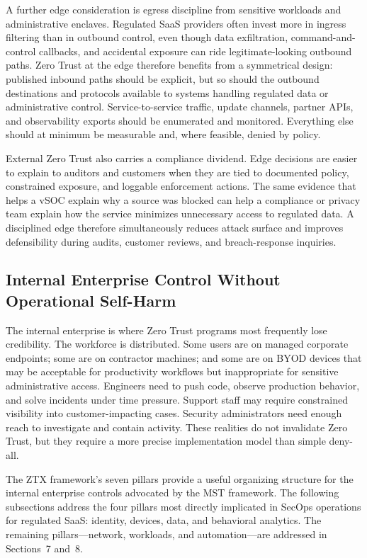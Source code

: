 \documentclass[acmlarge]{acmart}
\begin{document}
A further edge consideration is egress discipline from sensitive workloads and
administrative enclaves. Regulated SaaS providers often invest more in ingress filtering
than in outbound control, even though data exfiltration, command-and-control callbacks,
and accidental exposure can ride legitimate-looking outbound paths. Zero Trust at the edge
therefore benefits from a symmetrical design: published inbound paths should be explicit,
but so should the outbound destinations and protocols available to systems handling
regulated data or administrative control. Service-to-service traffic, update channels,
partner APIs, and observability exports should be enumerated and monitored. Everything
else should at minimum be measurable and, where feasible, denied by policy.

External Zero Trust also carries a compliance dividend. Edge decisions are easier to explain
to auditors and customers when they are tied to documented policy, constrained exposure,
and loggable enforcement actions. The same evidence that helps a vSOC explain why a source
was blocked can help a compliance or privacy team explain how the service minimizes
unnecessary access to regulated data. A disciplined edge therefore simultaneously reduces
attack surface and improves defensibility during audits, customer reviews, and
breach-response inquiries.

\subsection{Internal Enterprise Control Without Operational Self-Harm}
\label{sec:internal}

The internal enterprise is where Zero Trust programs most frequently lose credibility.
The workforce is distributed. Some users are on managed corporate endpoints; some are on
contractor machines; and some are on BYOD devices that may be acceptable for productivity
workflows but inappropriate for sensitive administrative access. Engineers need to push
code, observe production behavior, and solve incidents under time pressure. Support staff
may require constrained visibility into customer-impacting cases. Security administrators
need enough reach to investigate and contain activity. These realities do not invalidate
Zero Trust, but they require a more precise implementation model than simple deny-all.

The ZTX framework's seven pillars \cite{cunningham2018} provide a useful organizing
structure for the internal enterprise controls advocated by the MST framework. The
following subsections address the four pillars most directly implicated in SecOps
operations for regulated SaaS: identity, devices, data, and behavioral analytics. The
remaining pillars---network, workloads, and automation---are addressed in Sections~7 and~8.
\end{document}
